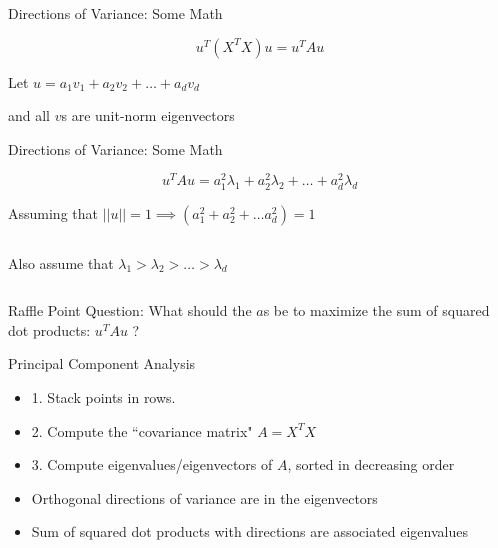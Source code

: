\documentclass{beamer}
\begin{document}
\begin{frame}{Directions of Variance: Some Math}

\[ u^T (X^TX) u = u^T A u \]

Let  $u = a_1 v_1 + a_2 v_2 + \hdots + a_d v_d$

and all $v$s are unit-norm eigenvectors





\end{frame}


\begin{frame}{Directions of Variance: Some Math}

\[ u^T Au = a_1^2 \lambda_1 + a_2^2 \lambda_2 + \hdots + a_d^2 \lambda_d \]

Assuming that $||u|| = 1 \implies (a_1^2 + a_2^2 + \hdots a_d^2) = 1$

\[ \]

Also assume that $\lambda_1 > \lambda_2 > \hdots > \lambda_d$

\[ \]

Raffle Point Question: What should the $a$s be to maximize the sum of squared dot products: $u^T Au$ ?

\end{frame}

\begin{frame}{Principal Component Analysis}

\begin{itemize}
\item 1. Stack points in rows. 
\item 2. Compute the ``covariance matrix" $A = X^T X$
\item 3. Compute eigenvalues/eigenvectors of $A$, sorted in decreasing order
\item Orthogonal directions of variance are in the eigenvectors
\item Sum of squared dot products with directions are associated eigenvalues
\end{itemize}

\end{frame}
\end{document}

